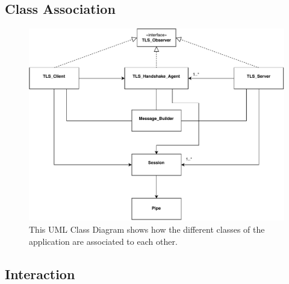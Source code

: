 \documentclass[12pt, letterpaper]{article}
\begin{document}
\subsection{Class Association}

\begin{figure}[H]
	\centering
	\includegraphics[width=.9\textwidth]{UML/ClassAssociation}
	\caption{This UML Class Diagram shows how the different classes of the application are associated to each other.}
	\label{fig:ClassAssociation}
\end{figure}

\subsection{Interaction}
\end{document}
